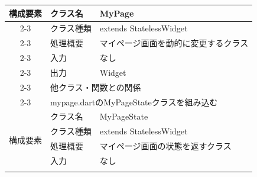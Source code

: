 \begin{longtable}{|c|l|l|}
  \multirow{7}{*}{構成要素} & クラス名                                                                                         & MyPage                                               \\ \cline{2-3}
                        & クラス種類                                                                                        & extends StatelessWidget                              \\ \cline{2-3}
                        & 処理概要                                                                                         & \multicolumn{1}{p{12cm}|}{マイページ画面を動的に変更するクラス}        \\ \cline{2-3}
                        & 入力                                                                                           & なし                                                   \\ \cline{2-3}
                        & 出力                                                                                           & Widget                                               \\ \cline{2-3}
                        & \multicolumn{2}{l|}{他クラス・関数との関係}                                                                                                                    \\ \cline{2-3}
                        & \multicolumn{2}{p{14cm}|}{mypage.dartのMyPageStateクラスを組み込む}                                                                                          \\ \hline
  \multirow{7}{*}{構成要素} & クラス名                                                                                         & MyPageState                                          \\ \cline{2-3}
                        & クラス種類                                                                                        & extends StatelessWidget                              \\ \cline{2-3}
                        & 処理概要                                                                                         & \multicolumn{1}{p{12cm}|}{マイページ画面の状態を返すクラス}          \\ \cline{2-3}
                        & 入力                                                                                           & なし                                                   \\ \cline{2-3}

\end{longtable}
